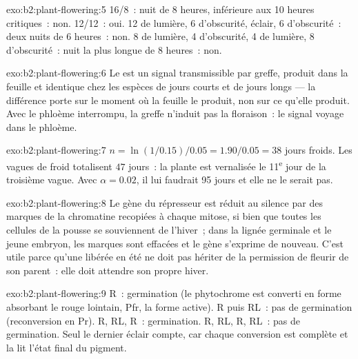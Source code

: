 \begin{solution}{exo:b2:plant-flowering:5}
16/8~: nuit de 8 heures, inférieure aux 10 heures critiques~: non.
12/12~: oui. 12 de lumière, 6 d'obscurité, éclair, 6 d'obscurité~: deux
nuits de 6 heures~: non. 8 de lumière, 4 d'obscurité, 4 de lumière,
8 d'obscurité~: nuit la plus longue de 8 heures~: non.
\end{solution}

\begin{solution}{exo:b2:plant-flowering:6}
Le  est un signal transmissible par greffe, produit dans la
feuille et identique chez les espèces de jours courts et de jours longs
--- la différence porte sur le moment où la feuille le produit, non sur
ce qu'elle produit. Avec le phloème interrompu, la greffe n'induit pas
la floraison~: le signal voyage dans le phloème.
\end{solution}

\begin{solution}{exo:b2:plant-flowering:7}
$n = \ln(1/0.15)/0.05 = 1.90/0.05 = 38$ jours froids. Les vagues de froid
totalisent $47$ jours~: la plante est vernalisée le 11\textsuperscript{e}
jour de la troisième vague. Avec $\alpha = 0.02$, il lui faudrait
95 jours et elle ne le serait pas.
\end{solution}

\begin{solution}{exo:b2:plant-flowering:8}
Le gène du répresseur est réduit au silence par des marques de la
chromatine recopiées à chaque mitose, si bien que toutes les cellules
de la pousse se souviennent de l'hiver~; dans la lignée germinale et le
jeune embryon, les marques sont effacées et le gène s'exprime de
nouveau. C'est utile parce qu'une  libérée en été ne doit pas
hériter de la permission de fleurir de son parent~: elle doit attendre
son propre hiver.
\end{solution}

\begin{solution}{exo:b2:plant-flowering:9}
R~: germination (le phytochrome est converti en forme absorbant le rouge
lointain, Pfr, la forme active). R puis RL~: pas de germination
(reconversion en Pr). R, RL, R~: germination. R, RL, R, RL~: pas de
germination. Seul le dernier éclair compte, car chaque conversion est
complète et la  lit l'état final du pigment.
\end{solution}

